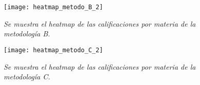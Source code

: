 \begin{figure}[H]
\centering
\texttt{[image: heatmap\_metodo\_B\_2]} %
\caption[\textit{Heatmap metodología B}]{\textit{Se muestra el heatmap de las calificaciones por materia de la metodología B.}}\label{fig_heatmap_B}
\end{figure}

\begin{figure}[H]
\centering
\texttt{[image: heatmap\_metodo\_C\_2]} %
\caption[\textit{Heatmap metodología C}]{\textit{Se muestra el heatmap de las calificaciones por materia de la metodología C.}}\label{fig_heatmap_C}
\end{figure}